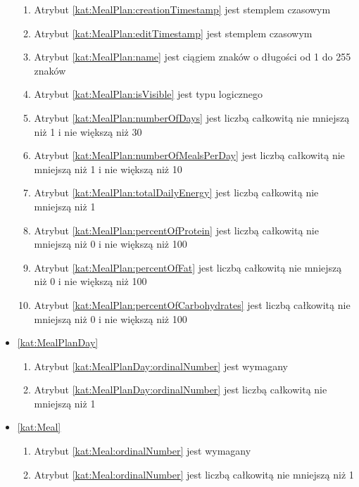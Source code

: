 \begin{itemize}[label={\textbf{Ograniczenia dla}}, wide, labelwidth=!, labelindent=0pt]
\begin{enumerate}[label={\textbf{OGR/\protect\threedigits{\arabic{enumi}}}}, wide, labelwidth=!, align=left, leftmargin=3cm, resume]
        \item Atrybut \ref{kat:MealPlan:creationTimestamp} jest stemplem czasowym
        \item Atrybut \ref{kat:MealPlan:editTimestamp} jest stemplem czasowym
        \item Atrybut \ref{kat:MealPlan:name} jest ciągiem znaków o długości od 1 do 255 znaków
        \item Atrybut \ref{kat:MealPlan:isVisible} jest typu logicznego
        \item Atrybut \ref{kat:MealPlan:numberOfDays} jest liczbą całkowitą nie mniejszą niż 1 i nie większą niż 30
        \item Atrybut \ref{kat:MealPlan:numberOfMealsPerDay} jest liczbą całkowitą nie mniejszą niż 1 i nie większą niż 10
        \item Atrybut \ref{kat:MealPlan:totalDailyEnergy} jest liczbą całkowitą nie mniejszą niż 1
        \item Atrybut \ref{kat:MealPlan:percentOfProtein} jest liczbą całkowitą nie mniejszą niż 0 i nie większą niż 100
        \item Atrybut \ref{kat:MealPlan:percentOfFat} jest liczbą całkowitą nie mniejszą niż 0 i nie większą niż 100
        \item Atrybut \ref{kat:MealPlan:percentOfCarbohydrates} jest liczbą całkowitą nie mniejszą niż 0 i nie większą niż 100
    \end{enumerate}

    \item\ref{kat:MealPlanDay}
    \begin{enumerate}[label={\textbf{OGR/\protect\threedigits{\arabic{enumi}}}}, wide, labelwidth=!, align=left, leftmargin=3cm, resume]
        \item Atrybut \ref{kat:MealPlanDay:ordinalNumber} jest wymagany

        \item Atrybut \ref{kat:MealPlanDay:ordinalNumber} jest liczbą całkowitą nie mniejszą niż 1
    \end{enumerate}

    \item\ref{kat:Meal}
    \begin{enumerate}[label={\textbf{OGR/\protect\threedigits{\arabic{enumi}}}}, wide, labelwidth=!, align=left, leftmargin=3cm, resume]
        \item Atrybut \ref{kat:Meal:ordinalNumber} jest wymagany

        \item Atrybut \ref{kat:Meal:ordinalNumber} jest liczbą całkowitą nie mniejszą niż 1
    \end{enumerate}


\end{itemize}
